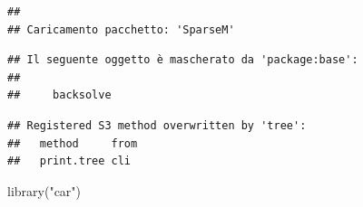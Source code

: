 \documentclass[
]{book}
\newenvironment{Shaded}{\begin{snugshade}}{\end{snugshade}}
\newcommand{\FunctionTok}[1]{\textcolor[rgb]{0.00,0.00,0.00}{#1}}
\newcommand{\NormalTok}[1]{#1}
\newcommand{\StringTok}[1]{\textcolor[rgb]{0.31,0.60,0.02}{#1}}
\begin{document}
\begin{verbatim}
## 
## Caricamento pacchetto: 'SparseM'
\end{verbatim}

\begin{verbatim}
## Il seguente oggetto è mascherato da 'package:base':
## 
##     backsolve
\end{verbatim}

\begin{verbatim}
## Registered S3 method overwritten by 'tree':
##   method     from
##   print.tree cli
\end{verbatim}

\begin{Shaded}
\begin{Highlighting}[]
\FunctionTok{library}\NormalTok{(}\StringTok{"car"}\NormalTok{)}


\end{Highlighting}
\end{Shaded}
\end{document}
